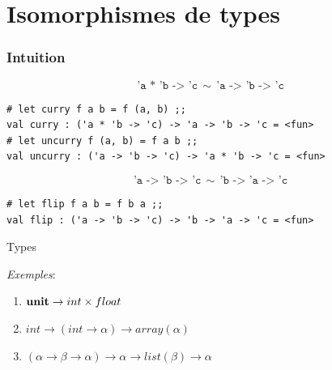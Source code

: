 \documentclass[serif]{beamer}
\newcommand{\exemples}{\textit{Exemples}\xspace}
\newcommand{\unit}{\bold{unit}}
\newcommand{\V}{\mathscr{V}}
\newcommand{\F}{\mathscr{F}}
\newcommand{\T}{\mathrm{T}}
\begin{document}

\section{Isomorphismes de types}


\begin{frame}[fragile=singleslide]\frametitle{Intuition}
\small
\[ \texttt{'a * 'b -> 'c} \ \ \sim\ \ \texttt{'a -> 'b -> 'c} \]
\begin{verbatim}
# let curry f a b = f (a, b) ;;
val curry : ('a * 'b -> 'c) -> 'a -> 'b -> 'c = <fun>
# let uncurry f (a, b) = f a b ;;
val uncurry : ('a -> 'b -> 'c) -> 'a * 'b -> 'c = <fun>
\end{verbatim}
\bigskip
\[ \texttt{'a -> 'b -> 'c} \ \ \sim\ \ \texttt{'b -> 'a -> 'c} \]
\begin{verbatim}
# let flip f a b = f b a ;;
val flip : ('a -> 'b -> 'c) -> 'b -> 'a -> 'c = <fun>
\end{verbatim}
\end{frame}


\begin{frame}{Types}
\exemples :
\begin{enumerate}
	\item $\unit \rightarrow int \times float$
	\item $int \rightarrow (int \rightarrow \alpha) \rightarrow array (\alpha)$
	\item $(\alpha \rightarrow \beta \rightarrow \alpha) \rightarrow \alpha \rightarrow list (\beta) \rightarrow \alpha$
\end{enumerate}
\end{frame}
\end{document}
